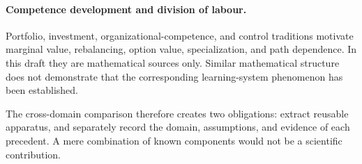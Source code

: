 \paragraph{Competence development and division of labour.}
Portfolio, investment, organizational-competence, and control traditions motivate marginal value, rebalancing, option value, specialization, and path dependence. In this draft they are mathematical sources only. Similar mathematical structure does not demonstrate that the corresponding learning-system phenomenon has been established.

The cross-domain comparison therefore creates two obligations: extract reusable apparatus, and separately record the domain, assumptions, and evidence of each precedent. A mere combination of known components would not be a scientific contribution.
